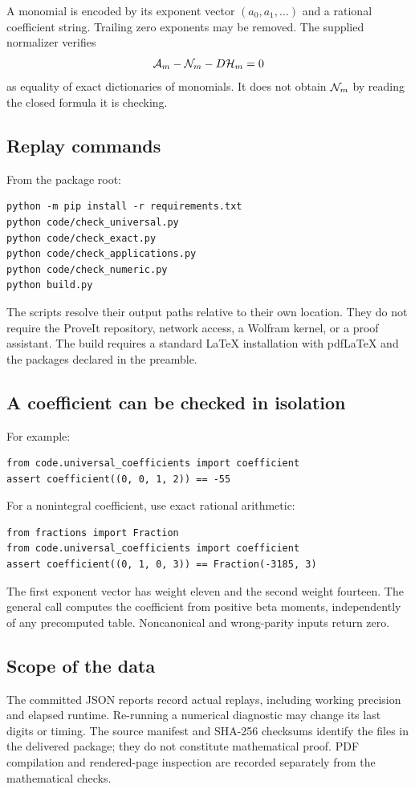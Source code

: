 A monomial is encoded by its exponent vector $(a_0,a_1,\ldots)$ and a rational coefficient string. Trailing zero exponents may be removed. The supplied normalizer verifies
\[
 \mathcal A_m-\mathcal N_m-D\mathcal H_m=0
\]
as equality of exact dictionaries of monomials. It does not obtain $\mathcal N_m$ by reading the closed formula it is checking.

\subsection{Replay commands}

From the package root:
\begin{verbatim}
python -m pip install -r requirements.txt
python code/check_universal.py
python code/check_exact.py
python code/check_applications.py
python code/check_numeric.py
python build.py
\end{verbatim}
The scripts resolve their output paths relative to their own location. They do not require the ProveIt repository, network access, a Wolfram kernel, or a proof assistant. The build requires a standard LaTeX installation with pdfLaTeX and the packages declared in the preamble.

\subsection{A coefficient can be checked in isolation}

For example:
\begin{verbatim}
from code.universal_coefficients import coefficient
assert coefficient((0, 0, 1, 2)) == -55
\end{verbatim}
For a nonintegral coefficient, use exact rational arithmetic:
\begin{verbatim}
from fractions import Fraction
from code.universal_coefficients import coefficient
assert coefficient((0, 1, 0, 3)) == Fraction(-3185, 3)
\end{verbatim}
The first exponent vector has weight eleven and the second weight fourteen. The general call computes the coefficient from positive beta moments, independently of any precomputed table. Noncanonical and wrong-parity inputs return zero.

\subsection{Scope of the data}

The committed JSON reports record actual replays, including working precision and elapsed runtime. Re-running a numerical diagnostic may change its last digits or timing. The source manifest and SHA-256 checksums identify the files in the delivered package; they do not constitute mathematical proof. PDF compilation and rendered-page inspection are recorded separately from the mathematical checks.
